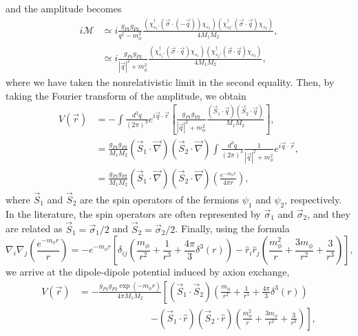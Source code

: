 \documentclass[12pt, a4paper]{article}
\begin{document}
%
and the amplitude becomes
%
\begin{align}
i\mathcal{M}& \simeq i\frac{g_{P1}g_{P2}}{q^2-m_\phi^2}\frac{
\left(\chi^\dag_{s_1'}(\vec{\sigma}\cdot(-\vec{q}))\chi_{s_1}\right)
\left(\chi^{\dag}_{s_2'}(\vec{\sigma}\cdot\vec{q})\chi_{s_2} \right)
}{4M_1M_2},  \\
&\simeq i\frac{g_{P1}g_{P2}}{|\vec{q}|^2+m_\phi^2}\frac{
\left(\chi^\dag_{s_1'}(\vec{\sigma}\cdot\vec{q})\chi_{s_1} \right)
\left(\chi^{\dag}_{s_2'}(\vec{\sigma}\cdot\vec{q})\chi_{s_2}\right)
}{4M_1M_2},%
\label{MP}
\end{align}
where we have taken the nonrelativistic limit in the second equality. 
Then, by taking the Fourier transform of the amplitude,  we obtain
%
\begin{align}
V(\vec{r})&=-\int\frac{d^3q}{(2\pi)^3} e^{i\vec{q}\cdot\vec{r}} \left[
\frac{g_{P1}g_{P2}}{|\vec{q}|^2+m_\phi^2}\frac{
(\vec{{ S}}_1\cdot\vec{q})(\vec{{ S}}_2\cdot\vec{q})
}{M_1M_2}\right],
\\
&=\frac{g_{P1}g_{P2}}{M_1M_2}(\vec{{ S}}_1\cdot\vec{\nabla})(\vec{{ S}}_2\cdot\vec{\nabla})\int\frac{d^3q}{(2\pi)^3}\frac{1}{|\vec{q}|^2+m_\phi^2} e^{i\vec{q}\cdot\vec{r}},\\
&=\frac{g_{P1}g_{P2}}{M_1M_2}(\vec{{ S}}_1\cdot\vec{\nabla})(\vec{{ S}}_2\cdot\vec{\nabla})\left(\frac{e^{-m_\phi r}}{4\pi r}\right),%
\end{align}
%
where $\vec{{S}}_{1}$ and $\vec{{S}}_{2}$ are the spin operators of the fermions $\psi_1$ and $\psi_2$, 
respectively. In the literature, the spin operators are often represented by $\vec{\sigma}_1$ and $\vec{\sigma}_2$,
and they are related as $\vec{{S}}_{1} = \vec{\sigma}_1/2$ and $\vec{{S}}_{2} = \vec{\sigma}_2/2$.
Finally,  using the formula
%
\begin{equation}
\nabla_i\nabla_j\left(\frac{e^{-m_\phi r}}{r}\right)=-e^{-m_\phi r}\left[\delta_{ij}\left(\frac{m_\phi}{r^2}+\frac{1}{r^3}+\frac{4\pi}{3}\delta^3(r)\right)-\hat{r}_i\hat{r}_j\left(\frac{m_\phi^2}{r}+\frac{3m_\phi}{r^2}+\frac{3}{r^3}\right)\right],%
\end{equation}
%
we arrive at the dipole-dipole potential induced by axion exchange,
\begin{align}
V(\vec{r})&=-\frac{g_{P1}g_{P2}\exp(-m_\phi r)}{4\pi M_1M_2}\left[(\vec{{S}}_{1}\cdot\vec{{S}}_{2})\left(\frac{m_\phi}{r^2}+\frac{1}{r^3}+\frac{4\pi}{3}\delta^3(r)\right) \right.\nonumber\\
&~~~~~~~~~~~~~~~~~~~~~~~~~~~~~~~~~~\left.-(\vec{{S}}_{1}\cdot\hat{r})(\vec{{S}}_{2}\cdot\hat{r})\left(\frac{m_\phi^2}{r}+\frac{3m_\phi}{r^2}+\frac{3}{r^3}\right)\right],
\label{vdp}
\end{align}%
\end{document}
